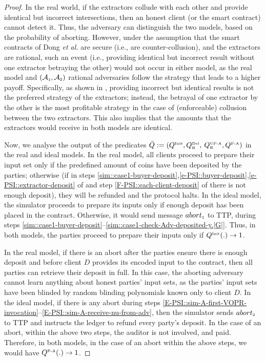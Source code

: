 \begin{proof}
 In the real world, if the extractors collude with each other and provide identical but incorrect intersections,   then an honest client (or the smart contract) cannot detect it. Thus, the adversary can distinguish the two models, based on the probability of aborting.  However, under the assumption that the smart contracts of Dong \textit{et al.} \cite{dong2017betrayal} are secure (i.e., are counter-collusion), and the extractors are rational, such an event (i.e., providing identical but incorrect result without one extractor betraying the other) would not occur in either model, as the real model and $(\mathcal{A}_{\scriptscriptstyle 1}, \mathcal{A}_{\scriptscriptstyle 2})$ rational adversaries follow the strategy that leads to a higher payoff. Specifically, as shown in \cite{dong2017betrayal}, providing incorrect but identical results is not the preferred strategy of the extractors; instead, the betrayal of one extractor by the other is the most profitable strategy in the case of (enforceable) collusion between the two extractors. This also implies that the amounts that the extractors would receive in both models are identical. 



Now, we analyse the output of the predicates $\bar Q:=(Q^{\scriptscriptstyle \text{Init}},  Q^{\scriptscriptstyle \text{Del}}_{\scriptscriptstyle\text{R}}, $ $Q^{\scriptscriptstyle \text{UF-A}}_{\scriptscriptstyle \text{R}}, Q^{\scriptscriptstyle \text{F-A}})$ in the real and ideal models. In the real model, all clients proceed to prepare their input set only if the predefined amount of coins have been deposited by the parties; otherwise (if in steps \ref{sim::case1-buyer-deposit},\ref{e-PSI::buyer-deposit},\ref{e-PSI::extractor-deposit} of \epsi and step \ref{F-PSI::each-client-deposit} of \fpsi there is not enough deposit), they will be refunded and the protocol halts. In the ideal model, the simulator proceeds to prepare its inputs only if enough deposit has been placed in the contract. Otherwise, it would send message $abort_{\scriptscriptstyle 1}$ to TTP, during steps \ref{sim::case1-buyer-deposit}--\ref{sim::case1-check-Adv-deposited-y.|G|}. Thus, in both models, the parties proceed to prepare their inputs only if $Q^{\scriptscriptstyle \text{Init}}(.) \rightarrow1$.  

In the real model, if there is an abort after the parties ensure there is enough deposit and before client $D$ provides its encoded input to the contract, then all parties can retrieve their deposit in full. In this case, the aborting adversary cannot learn anything about honest parties' input sets, as the parties' input sets have been blinded by random blinding polynomials known only to client $D$. In the ideal model, if there is any abort during steps \ref{E-PSI::sim-A-first-VOPR-invocation}--\ref{E-PSI::sim-A-receive-nu-from-adv}, then the simulator sends $abort_{\scriptscriptstyle 2}$ to TTP and instructs the ledger to refund every party's deposit. In the case of an abort, within the above two steps, the auditor is not involved, and paid. Therefore, in both models,  in the case of an abort within the above steps, we would have $Q^{\scriptscriptstyle \text{F-A}}(.)\rightarrow1$. 





\end{proof}
